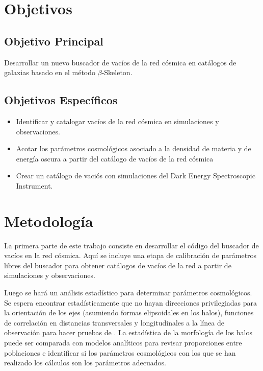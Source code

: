 \documentclass[preprint]{aastex62}
\begin{document}
  
  \section{Objetivos}

  \subsection{Objetivo Principal}
  Desarrollar un nuevo buscador de vacíos de la red cósmica en catálogos de galaxias
  basado en el método $\beta$-Skeleton.
  
  \subsection{Objetivos Específicos}

  \begin{itemize}    
      \item Identificar y catalogar vacíos de la red cósmica en
        simulaciones y observaciones.
      \item Acotar los parámetros cosmológicos asociado a la densidad
        de materia y de energía oscura a partir del catálogo de
        vacíos de la red cósmica
    \item  Crear un cat\'alogo de vaci\'os con simulaciones del Dark
      Energy Spectroscopic Instrument.
  \end{itemize}
  
  \section{Metodología}

  La primera parte de este trabajo consiste en desarrollar el código del buscador de vacíos
  en la red cósmica. Aquí se incluye una etapa de calibración de parámetros libres del buscador
  para obtener catálogos de vacíos de la red a partir de simulaciones y observaciones.
   
  Luego se hará un análisis estadístico para determinar parámetros cosmológicos.
  Se espera encontrar estadísticamente que no hayan direcciones privilegiadas para la orientación
  de los ejes (asumiendo formas elipsoidales en los halos), funciones de correlación en distancias
  transversales y longitudinales a la línea de observación para hacer pruebas de
  \citet{AlcockPaczynski1979}. La estadística de la morfología de los halos puede ser comparada
  con modelos analíticos para revisar proporciones entre poblaciones e identificar si los
  parámetros cosmológicos con los que se han realizado los cálculos son los parámetros adecuados.
  
\end{document}
